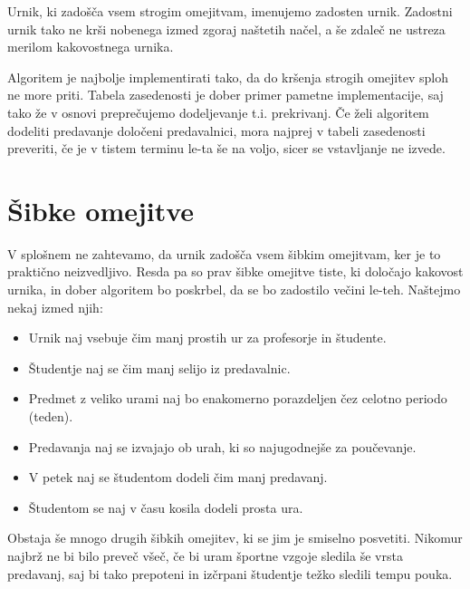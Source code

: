 \documentclass[a4paper,10pt]{article}
\begin{document}
Urnik, ki zadošča vsem strogim omejitvam, imenujemo zadosten urnik. Zadostni urnik tako ne
krši nobenega izmed zgoraj naštetih načel, a še zdaleč ne ustreza merilom kakovostnega urnika.

Algoritem je najbolje implementirati tako, da do kršenja strogih omejitev sploh ne more priti.
Tabela zasedenosti je dober primer pametne implementacije, saj tako že v osnovi  preprečujemo
dodeljevanje t.i. prekrivanj. Če želi algoritem dodeliti predavanje določeni predavalnici,
mora najprej v tabeli zasedenosti preveriti, če je v tistem terminu le-ta še na voljo,
sicer se vstavljanje ne izvede.

\section{Šibke omejitve}
V splošnem ne zahtevamo, da urnik zadošča vsem šibkim omejitvam, ker je to praktično neizvedljivo.
Resda pa so prav šibke omejitve tiste, ki določajo kakovost urnika, in dober algoritem bo
poskrbel, da se bo zadostilo večini le-teh. Naštejmo nekaj izmed njih:

\begin{itemize}
   \item Urnik naj vsebuje čim manj prostih ur za profesorje in študente.
   \item Študentje naj se čim manj selijo iz predavalnic.
   \item Predmet z veliko urami naj bo enakomerno porazdeljen čez celotno periodo (teden).
   \item Predavanja naj se izvajajo ob urah, ki so najugodnejše za poučevanje.
   \item V petek naj se študentom dodeli čim manj predavanj.
   \item Študentom se naj v času kosila dodeli prosta ura.
\end{itemize}



Obstaja še mnogo drugih šibkih omejitev, ki se jim je smiselno posvetiti. Nikomur najbrž ne
bi bilo preveč všeč, če bi uram športne vzgoje sledila še vrsta predavanj, saj bi tako
prepoteni in izčrpani študentje težko sledili tempu pouka.
\end{document}
